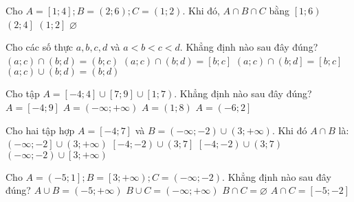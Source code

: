 \begin{ex}%
	Cho $A=\left[1;4\right]; B=\left(2;6\right); C=\left(1;2\right)$. Khi đó, $A\cap B\cap C$ bằng
	\choice
	{$\left[1;6\right)$}
	{$\left(2;4\right]$}
	{$\left(1;2\right]$}
	{\True $\varnothing $}
	\loigiai{
		Ta có $A\cap B=\left(2;4\right]\Rightarrow A\cap B\cap C=\varnothing $.
	}
\end{ex}

\begin{ex}%
    Cho các số thực $a,b,c,d$ và $a<b<c<d$. Khẳng định nào sau đây đúng?
    \choice
    {\True $\left(a;c\right)\cap\left(b;d\right)=\left(b;c\right)$}
    {$\left(a;c\right)\cap\left(b;d\right)=\left[b;c\right]$}
    {$\left(a;c\right)\cap\left(b;d\right]=\left[b;c\right]$}
    {$\left(a;c\right)\cup\left(b;d\right)=\left(b;d\right)$}
\end{ex}

\begin{ex}%
    Cho tập $A=\left[-4;4\right]\cup \left[7;9\right]\cup \left[1;7\right)$. Khẳng định nào sau đây đúng?
    \choice
    {\True $A=\left[-4;9\right]$}
    {$A=\left(-\infty ;+\infty\right)$}
    {$A=\left(1;8\right)$}
    {$A=\left(-6;2\right]$}
    \loigiai{
    	Ta có $A=\left[-4;4\right]\cup \left[7;9\right]\cup \left[1;7\right)=\left[-4;9\right]$.
	}
\end{ex}

\begin{ex}%
    Cho hai tập hợp $A=\left[-4;7\right]$ và $B=\left(-\infty ;-2\right)\cup \left(3;+\infty\right)$. Khi đó $A\cap B$ là:
    \choice
    {$\left(-\infty ;-2\right]\cup\left(3;+\infty\right)$}
    {\True $\left[-4;-2\right)\cup\left(3;7\right]$}
    {$\left[-4;-2\right)\cup\left(3;7\right)$}
    {$\left(-\infty ;-2\right)\cup\left[3;+\infty\right)$}
\end{ex}

\begin{ex}%
   Cho $A=\left(-5;1\right]; B=\left[3;+\infty\right); C=\left(-\infty ;-2\right)$. Khẳng định nào sau đây đúng?
   \choice
   {$A\cup B=\left(-5;+\infty\right)$}
   {$B\cup C=\left(-\infty ;+\infty\right)$}
   {\True $B\cap C=\varnothing $}
   {$A\cap C=\left[-5;-2\right]$}
   \loigiai{
   	Ta có $B\cap C=\left[3;+\infty\right)\cap\left(-\infty ;-2\right)=\varnothing $.
	}
\end{ex}

